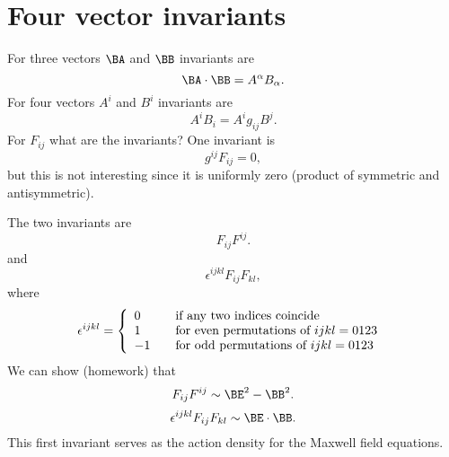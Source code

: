 %
%
\section{Four vector invariants}

For three vectors \(\BA\) and \(\BB\) invariants are
%
\begin{equation}\label{eqn:relativisticElectrodynamicsL11:510}
\BA \cdot \BB = A^\alpha B_\alpha.
\end{equation}
%
For four vectors \(A^i\) and \(B^i\) invariants are
%
\begin{equation}\label{eqn:relativisticElectrodynamicsL11:530}
A^i B_i = A^i g_{i j} B^j.
\end{equation}
%
For \(F_{i j}\) what are the invariants?  One invariant is
%
\begin{equation}\label{eqn:relativisticElectrodynamicsL11:550}
g^{i j} F_{i j} = 0,
\end{equation}
%
but this is not interesting since it is uniformly zero (product of symmetric and antisymmetric).

The two invariants are
%
\begin{equation}\label{eqn:relativisticElectrodynamicsL11:570}
F_{i j}F^{i j}.
\end{equation}
%
and
%
\begin{equation}\label{eqn:relativisticElectrodynamicsL11:590}
\epsilon^{i j k l} F_{i j}F_{k l},
\end{equation}
where
\begin{equation}\label{eqn:relativisticElectrodynamicsL11:610}
\epsilon^{i j k l} =
\left\{
\begin{array}{l l}
0 & \quad \mbox{if any two indices coincide} \\
1 & \quad \mbox{for even permutations of \(i j k l=0123\) } \\
-1 & \quad \mbox{for odd permutations of \(i j k l=0123\) } \\
\end{array}
\right.
\end{equation}
%
We can show (homework) that
%
\begin{equation}\label{eqn:relativisticElectrodynamicsL11:630}
F_{i j}F^{i j} \sim \BE^2 - \BB^2.
\end{equation}
%
\begin{equation}\label{eqn:relativisticElectrodynamicsL11:650}
\epsilon^{i j k l} F_{i j}F_{k l} \sim \BE \cdot \BB.
\end{equation}
%
This first invariant serves as the action density for the Maxwell field equations.

